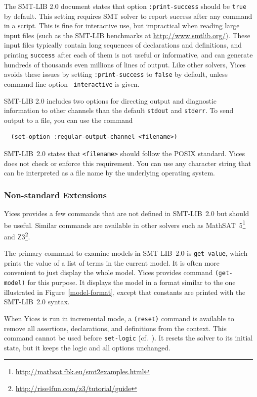 \documentclass[11pt,twoside,fleqn,openright,titlepage]{cslreport}
\begin{document}
The SMT-LIB 2.0 document states that option \texttt{:print-success}
should be \texttt{true} by default. This setting requires SMT solver
to report success after any command in a script. This is fine for
interactive use, but impractical when reading large input files (such
as the SMT-LIB benchmarks at \url{http://www.smtlib.org/}). These
input files typically contain long sequences of declarations and
definitions, and printing \texttt{success} after each of them is not
useful or informative, and can generate hundreds of thousands even
millions of lines of output.  Like other solvers, Yices avoids these
issues by setting \texttt{:print-success} to \texttt{false} by default,
unless command-line option \texttt{--interactive} is given.


\medskip\noindent SMT-LIB 2.0 includes two options for directing
output and diagnostic information to other channels than the default
\texttt{stdout} and \texttt{stderr}. To send output to a file, you can
use the command
\begin{small}
\begin{verbatim}
  (set-option :regular-output-channel <filename>)
\end{verbatim}
\end{small}
SMT-LIB~2.0 states that \texttt{<filename>} should follow the POSIX
standard. Yices does not check or enforce this requirement. You can
use any character string that can be interpreted as a file name by the
underlying operating system.


\subsubsection*{Non-standard Extensions}

Yices provides a few commands that are not defined in SMT-LIB~2.0 but
should be useful. Similar commands are available in other solvers such
as MathSAT~5\footnote{\url{http://mathsat.fbk.eu/smt2examples.html}} and
Z3\footnote{\url{http://rise4fun.com/z3/tutorial/guide}}.

\medskip\noindent The primary command to examine models in SMT-LIB~2.0
is \texttt{get-value}, which prints the value of a list of terms in
the current model. It is often more convenient to just display the
whole model.  Yices provides command \texttt{(get-model)} for this
purpose. It displays the model in a format similar to the one
illustrated in Figure~\ref{model-format}, except that constants are
printed with the SMT-LIB~2.0 syntax.

\medskip\noindent When Yices is run in incremental mode, a
\texttt{(reset)} command is available to remove all assertions,
declarations, and definitions from the context. This command cannot be
used before \texttt{set-logic} (cf.~\cite{SMTLIB20:2012}). It resets
the solver to its initial state, but it keeps the logic and all
options unchanged.
\end{document}
